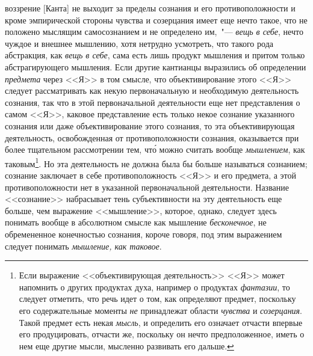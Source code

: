 воззрение [Канта] не выходит за пределы сознания
и его противоположности и кроме эмпирической стороны
чувства и созерцания имеет еще нечто такое, что не положено
мыслящим самосознанием и не определено им,~"---
\emph{вещь в себе}, нечто чуждое и внешнее мышлению, хотя
нетрудно усмотреть, что такого рода абстракция, как
\emph{вещь в себе}, сама есть лишь продукт мышления и притом
только абстрагирующего мышления. Если другие
кантианцы\endnotemark{} выразились об определении \emph{предмета} через
<<Я>> в том смысле, что объективирование этого <<Я>> следует
рассматривать как некую первоначальную и необходимую
деятельность сознания, так что в этой первоначальной
деятельности еще нет представления о самом
<<Я>>, каковое представление есть только некое сознание
указанного сознания или даже объективирование этого сознания,
то эта объективирующая деятельность, освобожденная
от противоположности сознания, оказывается при
более тщательном рассмотрении тем, чт\'о можно считать
вообще \emph{мышлением}, как таковым\footnote{Если выражение
  <<объективирующая деятельность>> <<Я>> может напомнить о
  других продуктах духа, например о продуктах \emph{фантазии},
  то следует отметить, что речь идет о том, как определяют
  предмет, поскольку его содержательные моменты \emph{не} принадлежат
  области \emph{чувства} и \emph{созерцания}. Такой предмет есть некая
  \emph{мысль}, и определить его означает отчасти впервые его продуцировать,
  отчасти же, поскольку он нечто предположенное, иметь
  о нем еще другие мысли, мысленно развивать его дальше.}. Но эта деятельность
не должна была бы больше называться сознанием; сознание
заключает в себе противоположность <<Я>> и его
предмета, а этой противоположности нет в указанной
первоначальной деятельности. Название <<сознание>> набрасывает
тень субъективности на эту деятельность еще
больше, чем выражение <<мышление>>, которое, однако,
следует здесь понимать вообще в абсолютном смысле как
мышление \emph{бесконечное}, не обремененное конечностью сознания,
короче говоря, под этим выражением следует
понимать \emph{мышление, как таковое}.



